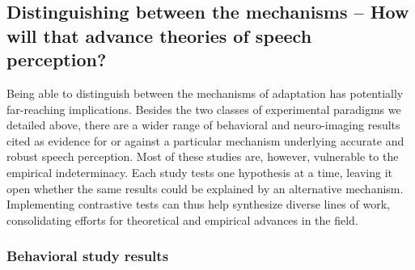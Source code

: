 \documentclass[
  11pt,
  english,
  man,floatsintext]{apa6}
\begin{document}
\hypertarget{distinguishing-between-the-mechanisms-how-will-that-advance-theories-of-speech-perception}{%
\subsection{Distinguishing between the mechanisms -- How will that advance theories of speech perception?}\label{distinguishing-between-the-mechanisms-how-will-that-advance-theories-of-speech-perception}}

Being able to distinguish between the mechanisms of adaptation has potentially far-reaching implications. Besides the two classes of experimental paradigms we detailed above, there are a wider range of behavioral and neuro-imaging results cited as evidence for or against a particular mechanism underlying accurate and robust speech perception. Most of these studies are, however, vulnerable to the empirical indeterminacy. Each study tests one hypothesis at a time, leaving it open whether the same results could be explained by an alternative mechanism. Implementing contrastive tests can thus help synthesize diverse lines of work, consolidating efforts for theoretical and empirical advances in the field.

\hypertarget{behavioral-study-results}{%
\subsubsection{Behavioral study results}\label{behavioral-study-results}}
\end{document}
